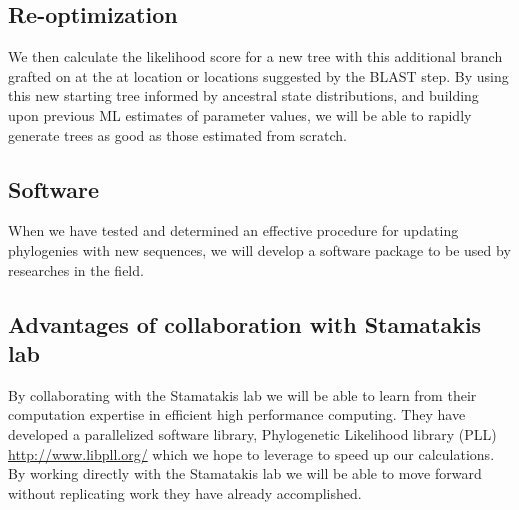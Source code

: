 \documentclass[10pt]{article}
\begin{document}
\subsection*{Re-optimization}
We then calculate the likelihood score for a new tree with this additional branch grafted on at the at location or locations suggested by the BLAST step. 
By using this new starting tree informed by ancestral state distributions, and building upon previous ML estimates of parameter values, we will be able to rapidly generate trees as good as those estimated from scratch. 


\subsection*{Software}
When we have tested and determined an effective procedure for updating phylogenies with new sequences, we will develop a software package to be used by researches in the field.

\subsection*{Advantages of collaboration with Stamatakis lab}
By collaborating with the Stamatakis lab we will be able to learn from their computation expertise in efficient high performance computing. 
They have developed a parallelized software library, Phylogenetic Likelihood library (PLL) \url{http://www.libpll.org/} which we hope to leverage to speed up our calculations. 
By working directly with the Stamatakis lab we will be able to move forward without replicating work they have already accomplished.
\end{document}
